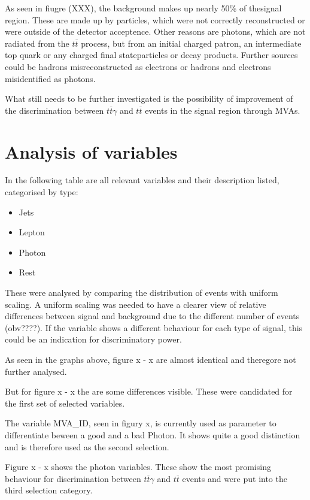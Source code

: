 \documentclass[11pt]{scrartcl}
\begin{document}
As seen in fiugre (XXX), the background makes up nearly 50\% of thesignal region. These are made up by particles, which were not correctly reconstructed or were outside of the detector acceptence. Other reasons are photons, which are not radiated from the $t\overline{t}$ process, but from an initial charged patron, an intermediate top quark or any charged final stateparticles or decay products. Further sources could be hadrons misreconstructed as electrons or hadrons and electrons misidentified as photons. 

What still needs to be further investigated is the possibility of improvement of the discrimination between $t\overline{t}\gamma$ and $t\overline{t}$ events in the signal region through MVAs.

\section{Analysis of variables}

In the following table are all relevant variables and their description listed, categorised by type:
\begin{itemize}
  \item Jets
  \item Lepton
  \item Photon
  \item Rest
\end{itemize}

These were analysed by comparing the distribution of events with uniform scaling. A uniform scaling was needed to have a clearer view of relative differences between signal and background due to the different number of events (obv????). If the variable shows a different behaviour for each type of signal, this could be an indication for discriminatory power. 

As seen in the graphs above, figure x - x are almost identical and theregore not further analysed.

But for figure x - x the are some differences visible. These were candidated for the first set of selected variables. 

The variable MVA\_ID, seen in figury x, is currently used as parameter to differentiate beween a good and a bad Photon. It shows quite a good distinction and is therefore used as the second selection.

Figure x - x shows the photon variables. These show the most promising behaviour for discrimination between $t\overline{t}\gamma$ and $t\overline{t}$ events and were put into the third selection category.
\end{document}
